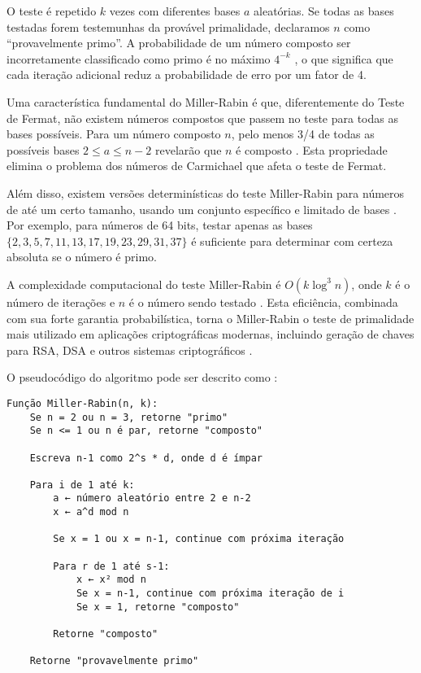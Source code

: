 O teste é repetido $k$ vezes com diferentes bases $a$ aleatórias. Se todas as bases testadas forem testemunhas da provável primalidade, declaramos $n$ como ``provavelmente primo''. A probabilidade de um número composto ser incorretamente classificado como primo é no máximo $4^{-k}$ \cite{rabin1980probabilistic, yan2009primality}, o que significa que cada iteração adicional reduz a probabilidade de erro por um fator de 4.

Uma característica fundamental do Miller-Rabin é que, diferentemente do Teste de Fermat, não existem números compostos que passem no teste para todas as bases possíveis. Para um número composto $n$, pelo menos 3/4 de todas as possíveis bases $2 \leq a \leq n-2$ revelarão que $n$ é composto \cite{crandall2005prime, yan2009primality}. Esta propriedade elimina o problema dos números de Carmichael que afeta o teste de Fermat.

Além disso, existem versões determinísticas do teste Miller-Rabin para números de até um certo tamanho, usando um conjunto específico e limitado de bases \cite{crandall2005prime, menezes1996handbook_miller}. Por exemplo, para números de 64 bits, testar apenas as bases $\{2, 3, 5, 7, 11, 13, 17, 19, 23, 29, 31, 37\}$ é suficiente para determinar com certeza absoluta se o número é primo.

A complexidade computacional do teste Miller-Rabin é $O(k \log^3 n)$, onde $k$ é o número de iterações e $n$ é o número sendo testado \cite{crandall2005prime}. Esta eficiência, combinada com sua forte garantia probabilística, torna o Miller-Rabin o teste de primalidade mais utilizado em aplicações criptográficas modernas, incluindo geração de chaves para RSA, DSA e outros sistemas criptográficos \cite{rabin1980probabilistic, menezes1996handbook_miller}.

O pseudocódigo do algoritmo pode ser descrito como \cite{shoup2009computational}:

\begin{verbatim}
Função Miller-Rabin(n, k):
    Se n = 2 ou n = 3, retorne "primo"
    Se n <= 1 ou n é par, retorne "composto"
    
    Escreva n-1 como 2^s * d, onde d é ímpar
    
    Para i de 1 até k:
        a ← número aleatório entre 2 e n-2
        x ← a^d mod n
        
        Se x = 1 ou x = n-1, continue com próxima iteração
        
        Para r de 1 até s-1:
            x ← x² mod n
            Se x = n-1, continue com próxima iteração de i
            Se x = 1, retorne "composto"
        
        Retorne "composto"
    
    Retorne "provavelmente primo"
\end{verbatim}

